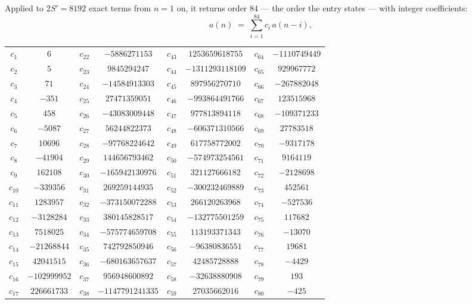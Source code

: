 \documentclass[11pt,a4paper]{article}
\theoremstyle{plain}
\theoremstyle{definition}
\begin{document}
Applied to $2S'=8192$ exact terms from $n=1$ on, it returns order $84$ --- the
order the entry states --- with integer coefficients:
\[
a(n)\;=\;\sum_{i=1}^{84}c_i\,a(n-i),
\]
\begin{center}\small
\begin{tabular}{cccccccc}
$c_{1}$ & $6$ & $c_{22}$ & $-5886271153$ & $c_{43}$ & $1253659618755$ & $c_{64}$ & $-1110749449$ \\
$c_{2}$ & $5$ & $c_{23}$ & $9845294247$ & $c_{44}$ & $-1311293118109$ & $c_{65}$ & $929967772$ \\
$c_{3}$ & $71$ & $c_{24}$ & $-14584913303$ & $c_{45}$ & $897956270710$ & $c_{66}$ & $-267882048$ \\
$c_{4}$ & $-351$ & $c_{25}$ & $27471359051$ & $c_{46}$ & $-993864491766$ & $c_{67}$ & $123515968$ \\
$c_{5}$ & $458$ & $c_{26}$ & $-43083009448$ & $c_{47}$ & $977813894118$ & $c_{68}$ & $-109371233$ \\
$c_{6}$ & $-5087$ & $c_{27}$ & $56244822373$ & $c_{48}$ & $-606371310566$ & $c_{69}$ & $27783518$ \\
$c_{7}$ & $10696$ & $c_{28}$ & $-97768224642$ & $c_{49}$ & $617758772002$ & $c_{70}$ & $-9317178$ \\
$c_{8}$ & $-41904$ & $c_{29}$ & $144656793462$ & $c_{50}$ & $-574973254561$ & $c_{71}$ & $9164119$ \\
$c_{9}$ & $162108$ & $c_{30}$ & $-165942130976$ & $c_{51}$ & $321127666182$ & $c_{72}$ & $-2128698$ \\
$c_{10}$ & $-339356$ & $c_{31}$ & $269259144935$ & $c_{52}$ & $-300232469889$ & $c_{73}$ & $452561$ \\
$c_{11}$ & $1283957$ & $c_{32}$ & $-373150072288$ & $c_{53}$ & $266120263968$ & $c_{74}$ & $-527536$ \\
$c_{12}$ & $-3128284$ & $c_{33}$ & $380145828517$ & $c_{54}$ & $-132775501259$ & $c_{75}$ & $117682$ \\
$c_{13}$ & $7518025$ & $c_{34}$ & $-575774659708$ & $c_{55}$ & $113193371343$ & $c_{76}$ & $-13070$ \\
$c_{14}$ & $-21268844$ & $c_{35}$ & $742792850946$ & $c_{56}$ & $-96380836551$ & $c_{77}$ & $19681$ \\
$c_{15}$ & $42041515$ & $c_{36}$ & $-680163657637$ & $c_{57}$ & $42485728888$ & $c_{78}$ & $-4429$ \\
$c_{16}$ & $-102999952$ & $c_{37}$ & $956948600892$ & $c_{58}$ & $-32638880908$ & $c_{79}$ & $193$ \\
$c_{17}$ & $226661733$ & $c_{38}$ & $-1147791241335$ & $c_{59}$ & $27035662016$ & $c_{80}$ & $-425$ \\

\end{tabular}
\end{center}
\end{document}
